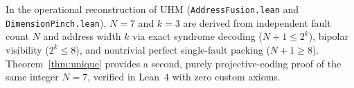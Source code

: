 \begin{remark}
In the operational reconstruction of UHM (\texttt{AddressFusion.lean} and
\texttt{DimensionPinch.lean}), $N=7$ and $k=3$ are derived from independent
fault count $N$ and address width $k$ via exact syndrome decoding
($N+1\le 2^k$), bipolar visibility ($2^k\le 8$), and nontrivial perfect
single-fault packing ($N+1\ge 8$). Theorem~\ref{thm:unique} provides a second,
purely projective-coding proof of the same integer $N=7$, verified in Lean~4
with zero custom axioms. 
\end{remark}
